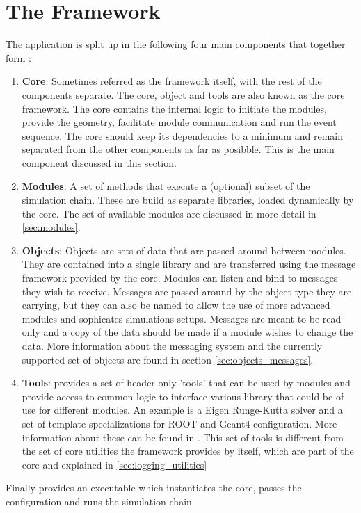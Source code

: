 \section{The \apsq Framework}
\label{sec:framework}
The application is split up in the following four main components that together form \apsq:
\begin{enumerate}
\item \textbf{Core}: Sometimes referred as the framework itself, with the rest of the components separate. The core, object and tools are also known as the core framework. The core contains the internal logic to initiate the modules, provide the geometry, facilitate module communication and run the event sequence. The core should keep its dependencies to a minimum and remain separated from the other components as far as posibble. This is the main component discussed in this section.
\item \textbf{Modules}: A set of methods that execute a (optional) subset of the simulation chain. These are build as separate libraries, loaded dynamically by the core. The set of available modules are discussed in more detail in \ref{sec:modules}.
\item \textbf{Objects}: Objects are sets of data that are passed around between modules. They are contained into a single library and are transferred using the message framework provided by the core. Modules can listen and bind to messages they wish to receive. Messages are passed around by the object type they are carrying, but they can also be named to allow the use of more advanced modules and sophicates simulations setups. Messages are meant to be read-only and a copy of the data should be made if a module wishes to change the data. More information about the messaging system and the currently supported set of objects are found in section \ref{sec:objects_messages}.
\item \textbf{Tools}: \apsq provides a set of header-only 'tools' that can be used by modules and provide access to common logic to interface various library that could be of use for different modules. An example is a Eigen Runge-Kutta solver and a set of template specializations for ROOT and Geant4 configuration. More information about these can be found in \needref. This set of tools is different from the set of core utilities the framework provides by itself, which are part of the core and explained in \ref{sec:logging_utilities}
\end{enumerate}
Finally \apsq provides an executable which instantiates the core, passes the configuration and runs the simulation chain.

